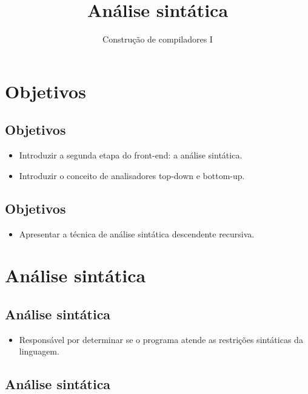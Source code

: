 \documentclass[11pt]{article}
\author{Construção de compiladores I}
\date{}
\title{Análise sintática}
\begin{document}
\maketitle

\section*{Objetivos}
\label{sec:orgdb362a4}

\subsection*{Objetivos}
\label{sec:orgd7dc65e}

\begin{itemize}
\item Introduzir a segunda etapa do front-end: a análise sintática.

\item Introduzir o conceito de analisadores top-down e bottom-up.
\end{itemize}

\subsection*{Objetivos}
\label{sec:org5e286bb}

\begin{itemize}
\item Apresentar a técnica de análise sintática descendente recursiva.
\end{itemize}

\section*{Análise sintática}
\label{sec:org76b2cb6}

\subsection*{Análise sintática}
\label{sec:org11752dd}

\begin{itemize}
\item Responsável por determinar se o programa atende as restrições sintáticas
da linguagem.
\end{itemize}

\subsection*{Análise sintática}
\label{sec:org555344f}
\end{document}
